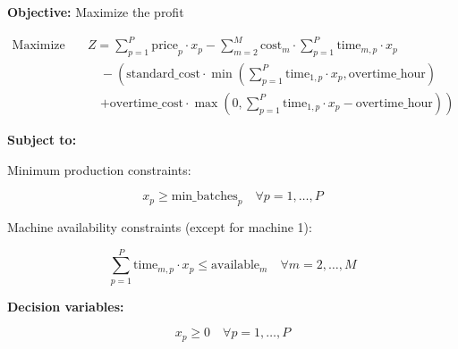 \documentclass{article}
\begin{document}
\textbf{Objective:} Maximize the profit

\[
\begin{aligned}
\text{Maximize} \quad & Z = \sum_{p=1}^P \text{price}_p \cdot x_p - \sum_{m=2}^M \text{cost}_m \cdot \sum_{p=1}^P \text{time}_{m,p} \cdot x_p \\
& \quad - \left( \text{standard\_cost} \cdot \min\left(\sum_{p=1}^P \text{time}_{1,p} \cdot x_p, \text{overtime\_hour}\right) \right. \\
& \quad \left. + \text{overtime\_cost} \cdot \max\left(0, \sum_{p=1}^P \text{time}_{1,p} \cdot x_p - \text{overtime\_hour}\right) \right)
\end{aligned}
\]

\textbf{Subject to:}

Minimum production constraints:

\[
x_p \geq \text{min\_batches}_p \quad \forall p = 1, \ldots, P
\]

Machine availability constraints (except for machine 1):

\[
\sum_{p=1}^P \text{time}_{m,p} \cdot x_p \leq \text{available}_m \quad \forall m = 2, \ldots, M
\]

\textbf{Decision variables:} 

\[
x_p \geq 0 \quad \forall p = 1, \ldots, P
\]
\end{document}
